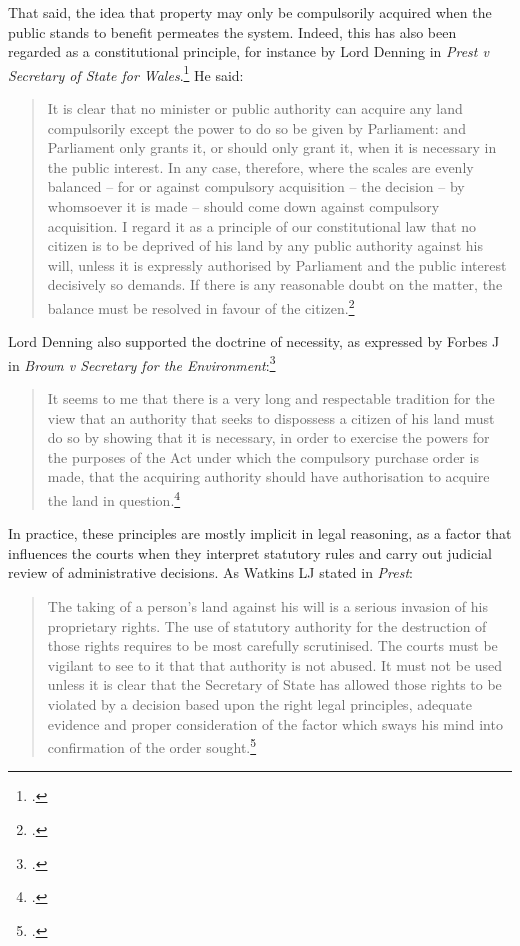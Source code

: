 \documentclass[12pt,a4paper]{book} %
\begin{document}
That said, the idea that property may only be compulsorily acquired when the public stands to benefit permeates the system. Indeed, this has also been regarded as a constitutional principle, for instance by Lord Denning in {\it Prest v Secretary of State for Wales}.\footcite{prest82} He said:

\begin{quote}
It is clear that no minister or public authority can acquire any land compulsorily except the power to do so be given by Parliament: and Parliament only grants it, or should only grant it, when it is necessary in the public interest. In any case, therefore, where the scales are evenly balanced – for or against compulsory acquisition – the decision – by whomsoever it is made – should come down against compulsory acquisition. I regard it as a principle of our constitutional law that no citizen is to be deprived of his land by any public authority against his will, unless it is expressly authorised by Parliament and the public interest decisively so demands. If there is any reasonable doubt on the matter, the balance must be resolved in favour of the citizen.\footcite[198]{prest82}
\end{quote}

Lord Denning also supported the doctrine of necessity, as expressed by Forbes J in {\it Brown v Secretary for the Environment}:\footcite{brown78}

\begin{quote}It seems to me that there is a very long and respectable tradition for the view that an authority that seeks to dispossess a citizen of his land must do so by showing that it is necessary, in order to exercise the powers for the purposes of the Act under which the compulsory purchase order is made, that the acquiring authority should have authorisation to acquire the land in question.\footcite[291]{brown78}
\end{quote}

In practice, these principles are mostly implicit in legal reasoning, as a factor that influences the courts when they interpret statutory rules and carry out judicial review of administrative decisions. As Watkins LJ stated in {\it Prest}:

\begin{quote}
The taking of a person's land against his will is a serious invasion of his proprietary rights. The use of statutory authority for the destruction of those rights requires to be most carefully scrutinised. The courts must be vigilant to see to it that that authority is not abused. It must not be used unless it is clear that the Secretary of State has allowed those rights to be violated by a decision based upon the right legal principles, adequate evidence and proper consideration of the factor which sways his mind into confirmation of the order sought.\footcite[211-212]{prest82}
\end{quote}
\end{document}
